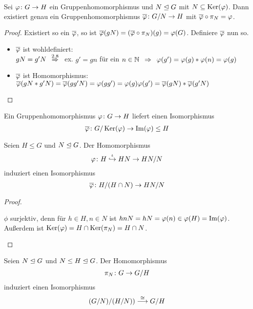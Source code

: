 %
\begin{satz}[Homomorphiesatz]
	Sei $\varphi \colon G \to H$ ein Gruppenhomomorphismus und $N \trianglelefteq G$ mit $N \subseteq \operatorname{Ker}(\varphi)$. Dann existiert genau ein Gruppenhomomorphismus $\overline{\varphi} \colon G/N \to H$ mit $\overline{\varphi} \circ \pi_N = \varphi$.
\end{satz}
\begin{proof}
	Existiert so ein $\overline{\varphi}$, so ist $\overline{\varphi}(gN)=(\overline{\varphi} \circ \pi_N)(g) = \varphi(G)$. Definiere $\overline{\varphi}$ nun so.
	\begin{itemize}
		\item $\overline{\varphi}$ ist wohldefiniert: \\
		$gN = g'N \overset{2.8}{\enspace \Rightarrow \enspace}$ ex. $g' = gn$ für ein $n \in \mathbb{N} \enspace \Rightarrow \enspace \varphi(g') = \varphi(g) * \varphi(n) = \varphi(g)$
		\item $\overline{\varphi}$ ist Homomorphismus: \\
		$\overline{\varphi}(gN * g'N) = \overline{\varphi}(gg'N) = \varphi(gg') = \varphi(g) \varphi(g') = \overline{\varphi}(gN) * \overline{\varphi}(g'N)$
	\end{itemize}
\end{proof}
%
\begin{kor}
	Ein Gruppenhomomorphismus $\varphi \colon G \to H$ liefert einen Isomorphismus
	\begin{align*}
		\overline{\varphi} \colon G/\operatorname{Ker}(\varphi) \to \operatorname{Im}(\varphi) \leq H
	\end{align*}
\end{kor}
%
\begin{kor}
	Seien $H \leq G$ und $N \trianglelefteq G$. Der Homomorphismus
	\begin{align*}
		\varphi \colon H \overset{\iota}{\hookrightarrow} HN \to HN/N 
	\end{align*}
	induziert einen Isomorphismus
	\begin{align*}
		\overline{\varphi} \colon H/(H \cap N) \to HN/N
	\end{align*}
\end{kor}
\begin{proof}
	\begin{itemize}
		$\phi$ surjektiv, denn für $h \in H, n \in N$ ist $hnN=hN=\varphi(n) \in \varphi(H) = \operatorname{Im}(\varphi)$. Außerdem ist $\operatorname{Ker}(\varphi) = H \cap \operatorname{Ker}(\pi_N) = H \cap N$.
	\end{itemize}
\end{proof}
%
\begin{kor}
	Seien $N \trianglelefteq G$ und $N \leq H \trianglelefteq G$. Der Homomorphismus
	\begin{align*}
		\pi_N \colon G \to G/H
	\end{align*}
	induziert einen Isomorphismus
	\begin{align*}
		(G/N)/(H/N)) \overset{\cong}{\longrightarrow} G/H 
	\end{align*}
\end{kor}
